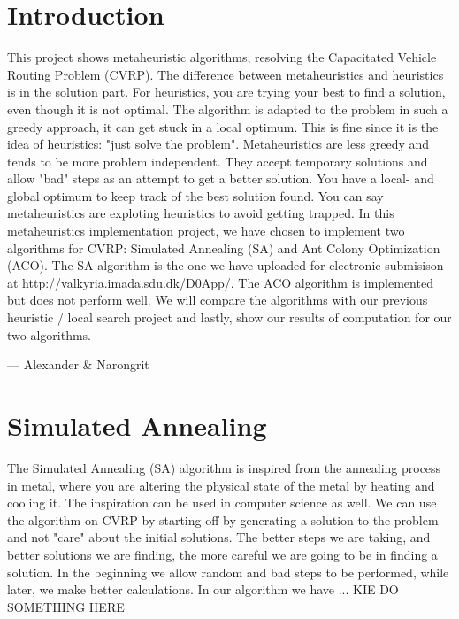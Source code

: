 \documentclass[12pt]{article}
\begin{document}

\tableofcontents
\pagebreak


\section{Introduction}

This project shows metaheuristic algorithms, resolving the Capacitated Vehicle Routing Problem (CVRP). The difference between metaheuristics and heuristics is in 
the solution part. For heuristics, you are trying your best to find a solution, even though it is not optimal. The algorithm is adapted to the problem
in such a greedy approach, it can get stuck in a local optimum. This is fine since it is the idea of heuristics: "just solve the problem". 
\newline
Metaheuristics are less greedy and tends to be more problem independent. They accept temporary solutions and allow "bad" steps as an attempt to get
a better solution. You have a local- and global optimum to keep track of the best solution found. You can say metaheuristics are exploting
heuristics to avoid getting trapped. 
\newline
In this metaheuristics implementation project, we have chosen to implement two algorithms for CVRP: Simulated Annealing (SA) and Ant Colony Optimization (ACO). 
The SA algorithm is the one we have uploaded for electronic submisison at http://valkyria.imada.sdu.dk/D0App/. The ACO algorithm is implemented but does not perform well.
We will compare the algorithms with our previous heuristic / local search project and lastly, show our results of computation for our two algorithms.

\hspace{1 cm}--- Alexander \& Narongrit

\newpage

\section{Simulated Annealing} 


The Simulated Annealing (SA) algorithm is inspired from the annealing process in metal, where you are altering the physical state of the metal 
by heating and cooling it. The inspiration can be used in computer science as well. We can use the algorithm on CVRP by starting off by generating a solution 
to the problem and not "care" about the initial solutions. The better steps we are taking, and better solutions we are finding, the more careful we are going to be in finding 
a solution. In the beginning we allow random and bad steps to be performed, while later, we make better calculations.
\newline
In our algorithm we have ... KIE DO SOMETHING HERE
\newline
\end{document}
